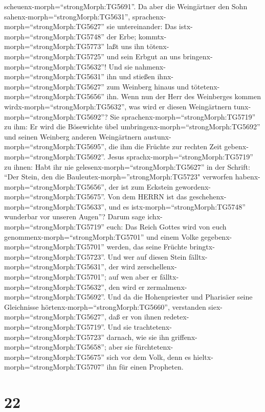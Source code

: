 scheuenx-morph=``strongMorph:TG5691''.  Da aber die
Weingärtner den Sohn sahenx-morph=``strongMorph:TG5631'',
sprachenx-morph=``strongMorph:TG5627'' sie untereinander: Das
istx-morph=``strongMorph:TG5748'' der Erbe;
kommtx-morph=``strongMorph:TG5773'' laßt uns ihn
tötenx-morph=``strongMorph:TG5725'' und sein Erbgut an uns
bringenx-morph=``strongMorph:TG5632''!  Und sie
nahmenx-morph=``strongMorph:TG5631'' ihn und stießen
ihnx-morph=``strongMorph:TG5627'' zum Weinberg hinaus und
tötetenx-morph=``strongMorph:TG5656'' ihn.  Wenn nun der
Herr des Weinberges kommen wirdx-morph=``strongMorph:TG5632'', was wird
er diesen Weingärtnern tunx-morph=``strongMorph:TG5692''? 
Sie sprachenx-morph=``strongMorph:TG5719'' zu ihm: Er wird die
Bösewichte übel umbringenx-morph=``strongMorph:TG5692'' und seinen
Weinberg anderen Weingärtnern austunx-morph=``strongMorph:TG5695'', die
ihm die Früchte zur rechten Zeit gebenx-morph=``strongMorph:TG5692''.
 Jesus sprachx-morph=``strongMorph:TG5719'' zu ihnen: Habt
ihr nie gelesenx-morph=``strongMorph:TG5627'' in der Schrift: ``Der
Stein, den die Bauleutex-morph=''strongMorph:TG5723" verworfen
habenx-morph=``strongMorph:TG5656'', der ist zum Eckstein
gewordenx-morph=``strongMorph:TG5675''. Von dem HERRN ist das
geschehenx-morph=``strongMorph:TG5633'', und es
istx-morph=``strongMorph:TG5748'' wunderbar vor unseren Augen''?
 Darum sage ichx-morph=``strongMorph:TG5719'' euch: Das
Reich Gottes wird von euch genommenx-morph=``strongMorph:TG5701'' und
einem Volke gegebenx-morph=``strongMorph:TG5701'' werden, das seine
Früchte bringtx-morph=``strongMorph:TG5723''.  Und wer auf
diesen Stein fälltx-morph=``strongMorph:TG5631'', der wird
zerschellenx-morph=``strongMorph:TG5701''; auf wen aber er
fälltx-morph=``strongMorph:TG5632'', den wird er
zermalmenx-morph=``strongMorph:TG5692''.  Und da die
Hohenpriester und Pharisäer seine Gleichnisse
hörtenx-morph=``strongMorph:TG5660'', verstanden
siex-morph=``strongMorph:TG5627'', daß er von ihnen
redetex-morph=``strongMorph:TG5719''.  Und sie
trachtetenx-morph=``strongMorph:TG5723'' darnach, wie sie ihn
griffenx-morph=``strongMorph:TG5658''; aber sie
fürchtetenx-morph=``strongMorph:TG5675'' sich vor dem Volk, denn es
hieltx-morph=``strongMorph:TG5707'' ihn für einen Propheten.

\hypertarget{section-21}{%
\section{22}\label{section-21}}

